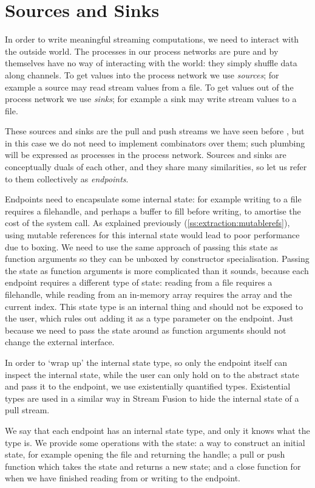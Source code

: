 \section{Sources and Sinks}
In order to write meaningful streaming computations, we need to interact with the outside world.
The processes in our process networks are pure and by themselves have no way of interacting with the world: they simply shuffle data along channels.
To get values into the process network we use \emph{sources}; for example a source may read stream values from a file.
To get values out of the process network we use \emph{sinks}; for example a sink may write stream values to a file.

These sources and sinks are the pull and push streams we have seen before , but in this case we do not need to implement combinators over them; such plumbing will be expressed as processes in the process network.
Sources and sinks are conceptually duals of each other, and they share many similarities, so let us refer to them collectively as \emph{endpoints}.

Endpoints need to encapsulate some internal state: for example writing to a file requires a filehandle, and perhaps a buffer to fill before writing, to amortise the cost of the system call.
As explained previously (\autoref{ss:extraction:mutablerefs}), using mutable references for this internal state would lead to poor performance due to boxing.
We need to use the same approach of passing this state as function arguments so they can be unboxed by constructor specialisation.
Passing the state as function arguments is more complicated than it sounds, because each endpoint requires a different type of state: reading from a file requires a filehandle, while reading from an in-memory array requires the array and the current index.
This state type is an internal thing and should not be exposed to the user, which rules out adding it as a type parameter on the endpoint.
Just because we need to pass the state around as function arguments should not change the external interface.

In order to `wrap up' the internal state type, so only the endpoint itself can inspect the internal state, while the user can only hold on to the abstract state and pass it to the endpoint, we use existentially quantified types.
Existential types are used in a similar way in Stream Fusion \cite{coutts2007stream} to hide the internal state of a pull stream.

We say that each endpoint has an internal state type, and only it knows what the type is.
We provide some operations with the state: a way to construct an initial state, for example opening the file and returning the handle; a pull or push function which takes the state and returns a new state; and a close function for when we have finished reading from or writing to the endpoint.

